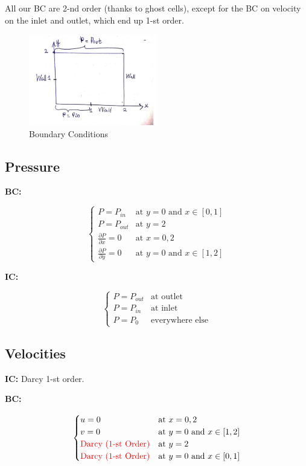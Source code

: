 \documentclass[a4paper,12pt]{article}
\begin{document}
All our BC are 2-nd order (thanks to ghost
    cells), except for the BC on velocity on the inlet
and outlet, which end up 1-st order.

\begin{figure}[H]
    \centering
    \includegraphics[width=0.5\textwidth]{img/diagram.pdf}
    \caption{Boundary Conditions}
    \label{fig:img-diagram-pdf}
\end{figure}

\subsection{Pressure}

\textbf{BC:}

\[
\begin{cases}
    P = P_{in} &\text{at } y = 0
    \text{ and } x \in [0, 1] \\
    P = P_{out} &\text{at } y = 2 \\
    \frac{\partial P}{\partial x} = 0 &\text{at }
    x = 0, 2 \\
    \frac{\partial P}{\partial y} = 0 &\text{at }
    y = 0 \text{ and } x \in [1, 2]
\end{cases}
\] 

\textbf{IC:}

\[
\begin{cases}
    P = P_{out} &\text{at outlet} \\
    P = P_{in}  &\text{at inlet} \\
    P = P_0     &\text{everywhere else}
\end{cases}
\] 

\subsection{Velocities}

\textbf{IC:} Darcy 1-st order.

\textbf{BC:}

\[
\begin{cases}
    u = 0 &\text{at } x = 0, 2 \\
    v = 0 &\text{at } y = 0 \text{ and } x \in [1, 2] \\
    {\color{red}\text{Darcy (1-st Order)}}
          &\text{at } y = 2 \\
    {\color{red}\text{Darcy (1-st Order)}}
          &\text{at } y = 0
    \text{ and } x \in [0, 1]\\
\end{cases}
\] 
\end{document}
